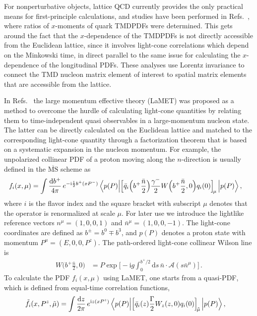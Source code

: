 \documentclass[11pt,a4paper]{article}
\DeclareRobustCommand{\mycites}[1]{Refs.~\cite{#1}}
\newcommand{\df}{\mathrm{d}}
\newcommand{\img}{\mathrm{i}}
\newcommand{\cA}{\mathcal{A}}
\newcommand{\bn}{{\bar{n}}}
\begin{document}
For nonperturbative objects, lattice QCD currently provides the only practical means for first-principle calculations, and studies have been performed in \mycites{Musch:2010ka,Musch:2011er,Engelhardt:2015xja,Yoon:2016dyh,Yoon:2017qzo}, where ratios of $x$-moments of quark TMDPDFs were determined.
This gets around the fact that the $x$-dependence of the TMDPDFs is not directly accessible from the Euclidean lattice, since it involves light-cone correlations which depend on the Minkowski time, in direct parallel to the same issue for calculating the $x$-dependence of the longitudinal PDFs. These analyses use Lorentz invariance to connect the TMD nucleon matrix element of interest to spatial matrix elements that are accessible from the lattice.

In \mycites{Ji:2013dva,Ji:2014gla} the large momentum effective theory (LaMET) was proposed as a method to overcome the hurdle of calculating light-cone quantities by relating them to time-independent quasi observables in a large-momentum nucleon state. The latter can be directly calculated on the Euclidean lattice and matched to the corresponding light-cone quantity through a factorization theorem that is based on a systematic expansion in the nucleon momentum.
%
For example, the unpolarized collinear PDF of a proton moving along the $n$-direction is usually defined in the $\overline{\mathrm{MS}}$ scheme as
\begin{align} \label{eq:pdf}
f_i(x,\mu) &= \int\frac{\df b^+}{4\pi} \, e^{-\img \frac{1}{2} b^+ (x P^-)} \,
\Bigl<p(P) \Big| \Bigl[\bar q_i\Big(b^+ \frac{\bn}{2}\Bigr)
\frac{\gamma^-}{2} W\Bigl(b^+\frac{\bn}{2},0\Bigr)  q_i(0)\Bigr]_{\!\mu} \,\Big| p(P) \Bigr>
\,,\end{align}
where $i$ is the flavor index and the square bracket with subscript $\mu$ denotes that the operator is renormalized at scale $\mu$. For later use we introduce the lightlike reference vectors $n^\mu=(1,0,0,1)$ and $\bn^\mu=(1,0,0,-1)$. The light-cone coordinates are defined as $b^{\pm} = b^0 \mp b^3$,
and $p(P)$ denotes a proton state with momentum $P^\mu = (E,0,0,P^z)$.
The path-ordered light-cone collinear Wilson line is
\begin{align}
W\Big(b^+\frac{\bn}{2},0\Big) &= P \exp\biggl[ -\img g \int^{b^+/2}_0 \df s\, \bn \cdot \cA(s \bn^\mu) \biggr]
\,.\end{align}
To calculate the PDF $f_i(x,\mu)$ using LaMET, one starts from a quasi-PDF, which is defined from equal-time correlation functions,
\begin{align} \label{eq:quasipdf}
\tilde{f}_i(x,P^z,\tilde\mu) &= \int\frac{\df z}{2\pi} \, e^{\img z (x P^z)} \,
\Bigl< p(P) \Big| \Bigl[\bar q_i(z)\frac{\Gamma}{2} W_z (z,0) q_i(0) \Bigr]_{\!\tilde\mu} \,\Big| p(P) \Bigr>
\,,\end{align}
\end{document}
